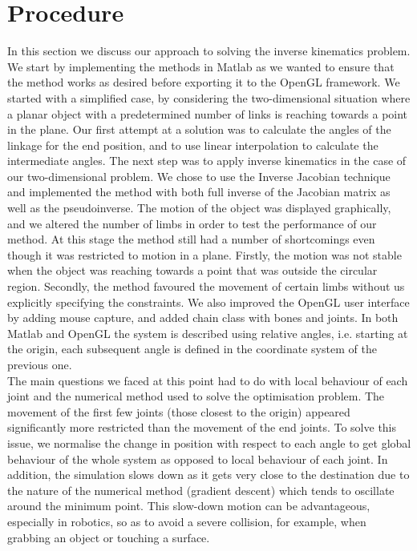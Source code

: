 \documentclass[paper=a4, fontsize=11pt]{scrartcl} %
\numberwithin{equation}{section} %
\numberwithin{figure}{section} %
\numberwithin{table}{section} %
\begin{document}
\section{Procedure}
In this section we discuss our approach to solving the inverse kinematics problem. We start by implementing the methods in Matlab as we wanted to ensure that the method works as desired before exporting it to the OpenGL framework. We started with a simplified case, by considering the two-dimensional situation where a planar object with a predetermined number of links is reaching towards a point in the plane. Our first attempt at a solution was to calculate the angles of the linkage for the end position, and to use linear interpolation to calculate the intermediate angles. The next step was to apply inverse kinematics in the case of our two-dimensional problem. We chose to use the Inverse Jacobian technique and implemented the method with both full inverse of the Jacobian matrix as well as the pseudoinverse. The motion of the object was displayed graphically, and we altered the number of limbs in order to test the performance of our method. At this stage the method still had a number of shortcomings even though it was restricted to motion in a plane. Firstly, the motion was not stable when the object was reaching towards a point that was outside the circular region. Secondly, the method favoured the movement of certain limbs without us explicitly specifying the constraints. We also improved the OpenGL user interface by adding mouse capture, and added chain class with bones and joints. In both Matlab and OpenGL the system is described using relative angles, i.e. starting at the origin, each subsequent angle is defined in the coordinate system of the previous one. \\

The main questions we faced at this point had to do with local behaviour of each joint and the numerical method used to solve the optimisation problem. The movement of the first few joints (those closest to the origin) appeared significantly more restricted than the movement of the end joints. To solve this issue, we normalise the change in position with respect to each angle to get global behaviour of the whole system as opposed to local behaviour of each joint. In addition, the simulation slows down as it gets very close to the destination due to the nature of the numerical method (gradient descent) which tends to oscillate around the minimum point. This slow-down motion can be advantageous, especially in robotics, so as to avoid a severe collision, for example, when grabbing an object or touching a surface. \\
\end{document}
